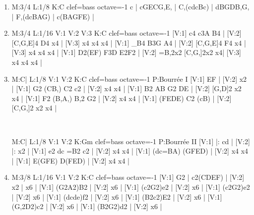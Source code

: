 \documentclass[a4paper,twoside]{article}
\begin{document}
\begin{center}
\begin{itemize}
\begin{enumerate}
  \item {}
\begin{abcsvg}
  M:3/4
  L:1/8
  K:C clef=bass octave=-1
  c | cGECG,E, |
  C,(cdcBc) |
  dBGDB,G, |
  F,(dcBAG) |
  c(BAGFE) |
\end{abcsvg}
  \makebox[2cm][l]{ \dotfill\ \pageref{IIIcourante}}
  \par\vspace{\titleseplen}

  \item {}
\begin{abcsvg}
  M:3/4
  L:1/16
  V:1
  V:2
  V:3
  K:C clef=bass octave=-1
  [V:1] c4 c3A B4 |
  [V:2] [C,G,E]4 D4 x4 |
  [V:3] x4 x4 x4 |
  [V:1] _B4 B3G A4 |
  [V:2] [C,G,E]4 F4 x4 |
  [V:3] x4 x4 x4 |
  [V:1] D2(EF) F3D E2F2 |
  [V:2] =B,2x2 [C,G,]2x2 x4|
  [V:3] x4 x4 x4 |
\end{abcsvg}
  \makebox[2cm][l]{ \dotfill\ \pageref{IIIsarabande}}
  \par\vspace{\titleseplen}

  \item {}
\begin{abcsvg}
  M:C|
  L:1/8
  V:1
  V:2
  K:C clef=bass octave=-1
  P:Bourr\'ee I
  [V:1] EF |
  [V:2] x2 |
  [V:1] G2 (CB,) C2 c2 |
  [V:2] x4 x4 |
  [V:1] B2 AB G2 DE |
  [V:2] [G,D]2 x2 x4 |
  [V:1] F2 (B,A,) B,2 G2 |
  [V:2] x4 x4 |
  [V:1] (FEDE) C2 (cB) |
  [V:2] [C,G,]2 x2 x4 |
\end{abcsvg}
  \\
  \hspace*{\titlelen}
\begin{abcsvg}
  M:C|
  L:1/8
  V:1
  V:2
  K:Gm clef=bass octave=-1
  P:Bourr\'ee II
  [V:1] |: cd |
  [V:2] |: x2 |
  [V:1] e2 dc =B2 c2 |
  [V:2] x4 x4 |
  [V:1] (dc=BA) (GFED) |
  [V:2] x4 x4 |
  [V:1] E(GFE) D(FED) |
  [V:2] x4 x4 |
\end{abcsvg}
  \makebox[2cm][l]{ \dotfill\ \pageref{IIIbourrees}}
  \par\vspace{\titleseplen}

  \item {}
\begin{abcsvg}
  M:3/8
  L:1/16
  V:1
  V:2
  K:C clef=bass octave=-1
  [V:1] G2 | c2(CDEF) |
  [V:2] x2 | x6 |
  [V:1] (G2A2)B2 |
  [V:2] x6 |
  [V:1] (c2G2)e2 |
  [V:2] x6 |
  [V:1] (c2G2)e2 |
  [V:2] x6 |
  [V:1] (dcde)f2 |
  [V:2] x6 |
  [V:1] (B2c2)E2 |
  [V:2] x6 |
  [V:1] (G,2D2)c2 |
  [V:2] x6 |
  [V:1] (B2G2)d2 |
  [V:2] x6 |
\end{abcsvg}
  \makebox[2cm][l]{ \dotfill\ \pageref{IIIgigue}}
  \end{enumerate}
  \par\vspace{\suitesep}
  

\end{itemize}
\end{center}
\end{document}
